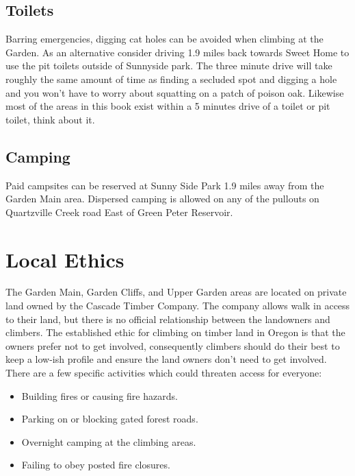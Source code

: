 \subsection*{Toilets}
Barring emergencies, digging cat holes can be avoided when climbing at the Garden. As an alternative consider driving 1.9 miles back towards Sweet Home to use the pit toilets outside of Sunnyside park. The three minute drive will take roughly the same amount of time as finding a secluded spot and digging a hole and you won't have to worry about squatting on a patch of poison oak. Likewise most of the areas in this book exist within a 5 minutes drive of a toilet or pit toilet, think about it. 
\subsection*{Camping}
Paid campsites can be reserved at Sunny Side Park 1.9 miles away from the Garden Main area. Dispersed camping is allowed on any of the pullouts on Quartzville Creek road East of Green Peter Reservoir. 
\section{Local Ethics}
The Garden Main, Garden Cliffs, and Upper Garden areas are located on private land owned by the Cascade Timber Company. The company allows walk in access to their land, but there is no official relationship between the landowners and climbers. The established ethic for climbing on timber land in Oregon is that the owners prefer not to get involved, consequently climbers should do their best to keep a low-ish profile and ensure the land owners don't need to get involved. There are a few specific activities which could threaten access for everyone:\\
\begin{itemize}
\item Building fires or causing fire hazards.\\
\item Parking on or blocking gated forest roads.\\
\item Overnight camping at the climbing areas.\\
\item Failing to obey posted fire closures.\\
\end{itemize}
